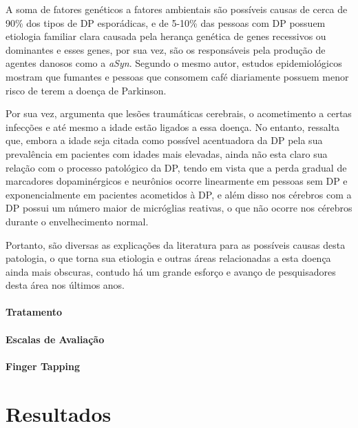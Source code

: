 \documentclass[
	12pt,				%
	openany,			%
	oneside,			%
	a4paper,			%
	english,			%
	french,				%
	spanish,			%
	brazil				%
	]{abntex2}
\begin{document}
A soma de fatores genéticos a fatores ambientais são possíveis causas de cerca de 90\% dos tipos de DP esporádicas, e de 5-10\% das pessoas com DP possuem etiologia familiar clara causada pela herança genética de genes recessivos ou dominantes e esses genes, por sua vez, são os responsáveis pela produção de agentes danosos como a \textit{aSyn}\cite{rana2011}. Segundo o mesmo autor, estudos epidemiológicos mostram que fumantes e pessoas que consomem café diariamente possuem menor risco de terem a doença de Parkinson.	

Por sua vez,  argumenta que lesões traumáticas cerebrais, o acometimento a certas infecções e até mesmo a idade estão ligados a essa doença. No entanto,  ressalta que, embora a idade seja citada como possível acentuadora da DP pela sua prevalência em pacientes com idades mais elevadas, ainda não esta claro sua relação com o processo patológico da DP, tendo em vista que a perda gradual de marcadores dopaminérgicos e neurônios ocorre linearmente em pessoas sem DP e exponencialmente em pacientes acometidos à DP, e além disso nos cérebros com a DP possui um número maior de micróglias reativas, o que não ocorre nos cérebros durante o envelhecimento normal.

Portanto, são diversas as explicações da literatura para as possíveis causas desta patologia, o que torna sua etiologia e outras áreas relacionadas a esta doença ainda mais obscuras, contudo há um grande esforço e avanço de pesquisadores desta área nos últimos anos.


\subsection{Tratamento}

\subsection{Escalas de Avaliação}

\subsection{Finger Tapping}

\part{Resultados}
\end{document}
